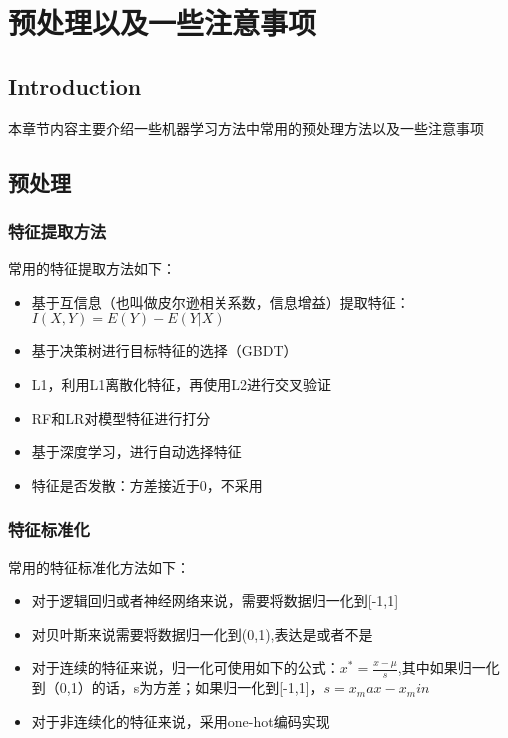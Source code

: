 \chapter{预处理以及一些注意事项}

\section*{Introduction}
	本章节内容主要介绍一些机器学习方法中常用的预处理方法以及一些注意事项

\section{预处理}
	\subsection{特征提取方法}
	常用的特征提取方法如下：
	
	\begin{itemize}
		\item 基于互信息（也叫做皮尔逊相关系数，信息增益）提取特征：$I(X,Y) = E(Y) - E(Y|X)$
		\item 基于决策树进行目标特征的选择（GBDT）
		\item L1，利用L1离散化特征，再使用L2进行交叉验证
		\item RF和LR对模型特征进行打分
		\item 基于深度学习，进行自动选择特征
		\item 特征是否发散：方差接近于0，不采用
	\end{itemize}
	
	\subsection{特征标准化}
	常用的特征标准化方法如下：
	
	\begin{itemize}
		\item 对于逻辑回归或者神经网络来说，需要将数据归一化到[-1,1]
		\item 对贝叶斯来说需要将数据归一化到(0,1),表达是或者不是
		\item 对于连续的特征来说，归一化可使用如下的公式：$x^* = \frac{x-\mu}{s}$,其中如果归一化到（0,1）的话，s为方差；如果归一化到[-1,1]，$s = x_max - x_min$
		\item 对于非连续化的特征来说，采用one-hot编码实现
	\end{itemize}